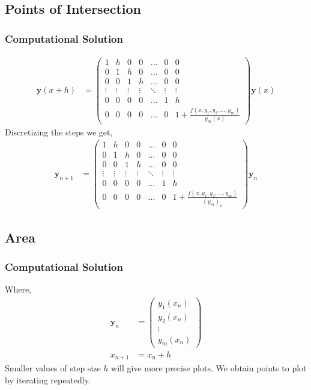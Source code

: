 \documentclass{beamer}
\providecommand{\brak}[1]{\ensuremath{\left(#1\right)}}
\theoremstyle{remark}
\newcommand{\myvec}[1]{\ensuremath{\begin{pmatrix}#1\end{pmatrix}}}
\let\vec\mathbf
\numberwithin{equation}{section}
\begin{document}
		\subsection{Points of Intersection}
		\begin{frame}
			\frametitle{Computational Solution}
      {\small
      \begin{align}
        \vec{y}\brak{x+h} &= \myvec{1 & h & 0 & 0 & \dots & 0 & 0\\ 0 & 1 & h & 0 & \dots & 0 & 0\\0 & 0 & 1 & h & \dots & 0 & 0\\\vdots & \vdots & \vdots & \vdots& \ddots & \vdots & \vdots\\
  0 & 0 & 0 & 0 & \dots & 1 & h\\0 & 0 & 0 & 0 & \dots & 0 & 1+\frac{f\brak{x, y_1, y_2, \dots, y_m}}{y_m\brak{x}}}\vec{y}\brak{x}
      \end{align}
      }
Discretizing the steps we get,
      {\small
\begin{align}
  \vec{y}_{n+1}&=\myvec{1 & h & 0 & 0 & \dots & 0 & 0\\ 0 & 1 & h & 0 & \dots & 0 & 0\\0 & 0 & 1 & h & \dots & 0 & 0\\\vdots & \vdots & \vdots & \vdots& \ddots & \vdots & \vdots\\
  0 & 0 & 0 & 0 & \dots & 1 & h\\0 & 0 & 0 & 0 & \dots & 0 &1+\frac{f\brak{x, y_1, y_2, \dots, y_m}}{\brak{y_m}_n}}\vec{y}_{n}
\end{align}
      }
		\end{frame}
		\subsection{Area}
		\begin{frame}[fragile]
			\frametitle{Computational Solution}
Where,
\begin{align}
  \vec{y}_n&=\myvec{y_1\brak{x_n} \\ y_2\brak{x_n} \\ \vdots \\ y_m\brak{x_n}}\\
  x_{n+1}&=x_n+h  
\end{align}
Smaller values of step size $h$ will give more precise plots. We obtain points to plot by iterating repeatedly. 
		\end{frame}
\end{document}
